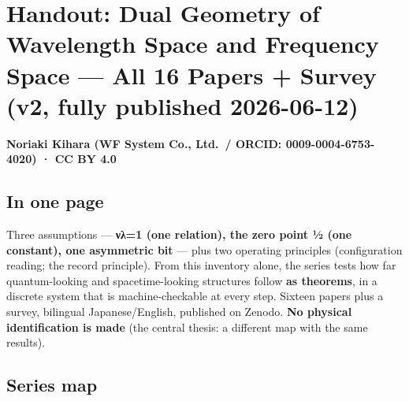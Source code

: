 \documentclass[
  10pt,
]{article}
\author{}
\date{}
\begin{document}
\section{Handout: Dual Geometry of Wavelength Space and Frequency Space
--- All 16 Papers + Survey (v2, fully published
2026-06-12)}\label{handout-dual-geometry-of-wavelength-space-and-frequency-space-all-16-papers-survey-v2-fully-published-2026-06-12}

\textbf{Noriaki Kihara (WF System Co., Ltd.~/ ORCID:
0009-0004-6753-4020) · CC BY 4.0}

\subsection{In one page}\label{in-one-page}

Three assumptions --- \textbf{νλ=1 (one relation), the zero point ½ (one
constant), one asymmetric bit} --- plus two operating principles
(configuration reading; the record principle). From this inventory
alone, the series tests how far quantum-looking and spacetime-looking
structures follow \textbf{as theorems}, in a discrete system that is
machine-checkable at every step. Sixteen papers plus a survey, bilingual
Japanese/English, published on Zenodo. \textbf{No physical
identification is made} (the central thesis: a different map with the
same results).

\subsection{Series map}\label{series-map}
\end{document}
